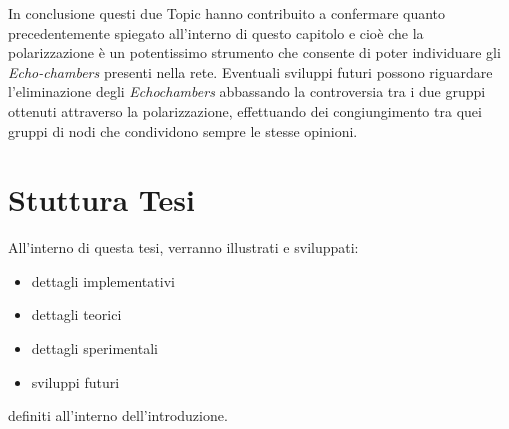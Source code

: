 In conclusione questi due Topic hanno contribuito a confermare quanto precedentemente spiegato all'interno di questo capitolo e cioè che la polarizzazione è un potentissimo strumento che consente di poter individuare gli \textit{Echo-chambers} presenti nella rete. %
Eventuali sviluppi futuri possono riguardare l'eliminazione degli \textit{Echochambers} abbassando la controversia tra i due gruppi ottenuti attraverso la polarizzazione, effettuando dei congiungimento tra quei gruppi di nodi che condividono sempre le stesse opinioni.
\newpage
\section{Stuttura Tesi}
All'interno di questa tesi, verranno illustrati e sviluppati:
\begin{itemize}
\item dettagli implementativi
\item dettagli teorici
\item dettagli sperimentali
\item sviluppi futuri
\end{itemize}
definiti all'interno dell'introduzione.

